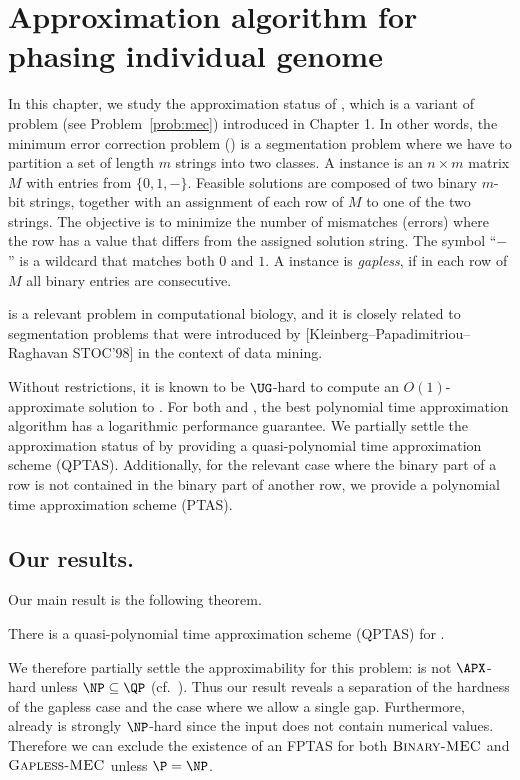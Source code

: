 \chapter{Approximation algorithm for phasing individual genome}

In this chapter, we study the approximation status of \GMEC, which is a variant of \MEC problem (see Problem~\ref{prob:mec}) introduced in Chapter 1.
In other words, the minimum error correction problem (\MEC) is a segmentation problem where we have to partition a set of length $m$ strings into two classes.
A \MEC instance is an $n \times m$ matrix $M$ with entries from $\{0,1,-\}$. 
    Feasible solutions are composed of two binary $m$-bit strings, together with an assignment of each row of $M$ to one of the two strings.
    The objective is to minimize the number of mismatches (errors) where the row has a value that differs from the assigned solution string.
    The symbol ``$-$'' is a wildcard that matches both $0$ and $1$.
    A \MEC instance is \textit{gapless}, if in each row of $M$ all binary entries are consecutive.

 \GMEC is a relevant problem in computational biology, and it is closely related to segmentation problems that were introduced by {[}Kleinberg--Papadimitriou--Raghavan STOC'98{]} in the context of data mining.
 
     Without restrictions, it is known to be $\UG$-hard to compute an $O(1)$-approximate solution to \MEC. For both \MEC and \GMEC, the best polynomial time approximation algorithm has a logarithmic performance guarantee.
    We partially settle the approximation status of \GMEC by providing a quasi-polynomial time approximation scheme (QPTAS).
    Additionally, for the relevant case where the binary part of a row is not contained in the binary part of another row, we provide a polynomial time approximation scheme (PTAS).

\section{Our results.}
Our main result is the following theorem.
\begin{theorem}\label{thm:qptas}
    There is a quasi-polynomial time approximation scheme (QPTAS) for \GMEC.
\end{theorem}
We therefore partially settle the approximability for this problem: \GMEC is not $\APX$-hard unless $\NP \subseteq \QP$ (cf.~\cite{RS09_approximation}).
Thus our result reveals a separation of the hardness of the gapless case and the case where we allow a single gap.
Furthermore, already \BMEC is strongly $\NP$-hard since the input does not contain numerical values. 
Therefore we can exclude the existence of an FPTAS for both $\textsc{Binary-MEC}$ and $\textsc{Gapless-MEC}$ unless $\P = \NP$.

